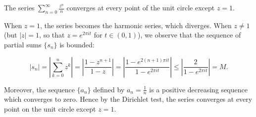 The series $\sum\limits_{n=0}^{\infty}{\frac{z^n}{n}}$ converges at every point of the unit circle except $z = 1$.

\begin{solution}
    When $z = 1$, the series becomes the harmonic series, which diverges. When $z \neq 1$ (but $|z| = 1$, so that 
    $z = e^{2 \pi i t}$ for $t \in (0, 1)$), we observe that the sequence of partial sums $\{s_n\}$ is bounded:

    $$
    |s_n| = \left| \sum\limits_{k=0}^n z^k \right|
          = \left| \frac{1 - z^{n+1}}{1 - z} \right|
          = \left| \frac{1 - e^{2 (n+1) \pi i t}}{1 - e^{2 \pi i t}} \right|
          \le \left| \frac{2}{1 - e^{2 \pi i t}} \right|
          = M.
    $$

    Moreover, the sequence $\{a_n\}$ defined by $a_n = \frac{1}{n}$ is a positive decreasing sequence which converges to 
    zero. Hence by the Dirichlet test, the series converges at every point on the unit circle except $z = 1$.
    \ \\
\end{solution}